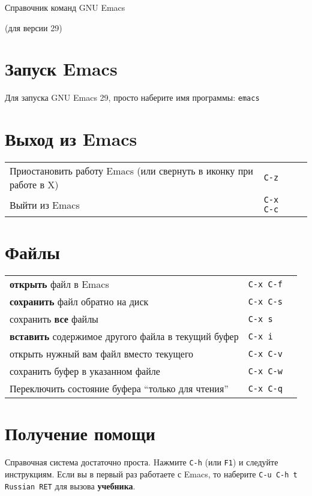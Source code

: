 \documentclass[10pt]{article}
\newlength{\ColWidth}
\newlength{\ColThreeWidth}
\newcommand{\versionemacs}[0]{29} %
\newcommand{\kbd}[1]{\texttt{#1}}
\begin{document}

\centerline{Справочник команд GNU Emacs}
\centerline{(для версии \versionemacs)}

\section{Запуск Emacs}

Для запуска GNU Emacs \versionemacs, просто наберите имя программы: \kbd{emacs}

\section{Выход из Emacs}

\begin{tabular}{p{\ColWidth}p{\ColThreeWidth}p{\ColThreeWidth}}
Приостановить работу Emacs (или свернуть в иконку при работе в X) & \kbd{C-z} \\
Выйти из Emacs & \kbd{C-x C-c} \\
\end{tabular}

\section{Файлы}

\begin{tabular}{p{\ColWidth}p{\ColThreeWidth}p{\ColThreeWidth}}
{\bf открыть} файл в Emacs & \kbd{C-x C-f} \\
{\bf сохранить} файл обратно на диск & \kbd{C-x C-s} \\
сохранить {\bf все} файлы & \kbd{C-x s} \\
{\bf вставить} содержимое другого файла в текущий буфер & \kbd{C-x i} \\
открыть нужный вам файл вместо текущего & \kbd{C-x C-v} \\
сохранить буфер в указанном файле & \kbd{C-x C-w} \\
Переключить состояние буфера ``только для чтения'' & \kbd{C-x C-q} \\
\end{tabular}

\section{Получение помощи}

Справочная система достаточно проста. Hажмите \kbd{C-h} (или \kbd{F1}) и
следуйте инструкциям.  Если вы в первый раз работаете с Emacs, то наберите
\kbd{C-u C-h t Russian RET} для вызова {\bf учебника}.
\end{document}
